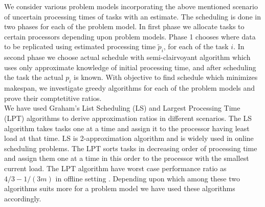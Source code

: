 \documentclass[10pt, conference, compsocconf]{IEEEtran}
\begin{document}
We consider various problem models  incorporating the above mentioned scenario of uncertain processing times of tasks with an estimate. The scheduling is done in two phases for each of the problem model.  In first phase we allocate tasks to certain processors depending upon problem models.  Phase 1 chooses where data to be  replicated using estimated processing time $\tilde p_i $, for each of the task $i$.  In second phase we choose actual schedule with semi-clairvoyant algorithm which uses only approximate knowledge of initial processing time, and after scheduling the task the actual $p_i$ is known.  With  objective to find schedule which minimizes makespan, we investigate greedy algorithms for each of the problem models and prove their comptetitive ratios. \\

We have used  Graham's List Scheduling (LS) and Largest Processing Time (LPT) algorithms to derive approximation ratios in different scenarios. The LS algorithm takes tasks one at a time and assign  it to the processor having least load at that time. LS is 2-approximation algorithm and is widely used in online scheduling problems.  The LPT sorts tasks in decreasing order of processing time and assign them one at a time in this order to the processor with the smallest current load. The LPT algorithm have worst case performance ratio as $4/3-1/(3m) $ in offline setting
. Depending upon which among these two algorithms suits more for a problem model we have used these algorithms accordingly. 
\end{document}
